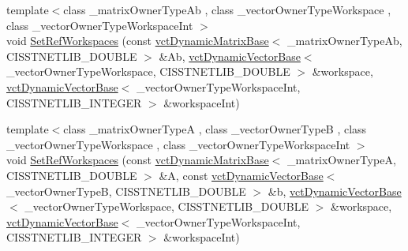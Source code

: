 {\bf }\par
\begin{DoxyCompactItemize}
\item 
{\footnotesize template$<$class \+\_\+matrix\+Owner\+Type\+Ab , class \+\_\+vector\+Owner\+Type\+Workspace , class \+\_\+vector\+Owner\+Type\+Workspace\+Int $>$ }\\void \hyperlink{classnmr_n_n_l_s_dynamic_data_aeb25b4cee0bfbbb2dacafa03fe1b8792}{Set\+Ref\+Workspaces} (const \hyperlink{classvct_dynamic_matrix_base}{vct\+Dynamic\+Matrix\+Base}$<$ \+\_\+matrix\+Owner\+Type\+Ab, C\+I\+S\+S\+T\+N\+E\+T\+L\+I\+B\+\_\+\+D\+O\+U\+B\+L\+E $>$ \&Ab, \hyperlink{classvct_dynamic_vector_base}{vct\+Dynamic\+Vector\+Base}$<$ \+\_\+vector\+Owner\+Type\+Workspace, C\+I\+S\+S\+T\+N\+E\+T\+L\+I\+B\+\_\+\+D\+O\+U\+B\+L\+E $>$ \&workspace, \hyperlink{classvct_dynamic_vector_base}{vct\+Dynamic\+Vector\+Base}$<$ \+\_\+vector\+Owner\+Type\+Workspace\+Int, C\+I\+S\+S\+T\+N\+E\+T\+L\+I\+B\+\_\+\+I\+N\+T\+E\+G\+E\+R $>$ \&workspace\+Int)
\item 
{\footnotesize template$<$class \+\_\+matrix\+Owner\+Type\+A , class \+\_\+vector\+Owner\+Type\+B , class \+\_\+vector\+Owner\+Type\+Workspace , class \+\_\+vector\+Owner\+Type\+Workspace\+Int $>$ }\\void \hyperlink{classnmr_n_n_l_s_dynamic_data_a7e6d209d11bb6be20c6c4293679b3350}{Set\+Ref\+Workspaces} (const \hyperlink{classvct_dynamic_matrix_base}{vct\+Dynamic\+Matrix\+Base}$<$ \+\_\+matrix\+Owner\+Type\+A, C\+I\+S\+S\+T\+N\+E\+T\+L\+I\+B\+\_\+\+D\+O\+U\+B\+L\+E $>$ \&A, const \hyperlink{classvct_dynamic_vector_base}{vct\+Dynamic\+Vector\+Base}$<$ \+\_\+vector\+Owner\+Type\+B, C\+I\+S\+S\+T\+N\+E\+T\+L\+I\+B\+\_\+\+D\+O\+U\+B\+L\+E $>$ \&b, \hyperlink{classvct_dynamic_vector_base}{vct\+Dynamic\+Vector\+Base}$<$ \+\_\+vector\+Owner\+Type\+Workspace, C\+I\+S\+S\+T\+N\+E\+T\+L\+I\+B\+\_\+\+D\+O\+U\+B\+L\+E $>$ \&workspace, \hyperlink{classvct_dynamic_vector_base}{vct\+Dynamic\+Vector\+Base}$<$ \+\_\+vector\+Owner\+Type\+Workspace\+Int, C\+I\+S\+S\+T\+N\+E\+T\+L\+I\+B\+\_\+\+I\+N\+T\+E\+G\+E\+R $>$ \&workspace\+Int)
\end{DoxyCompactItemize}

